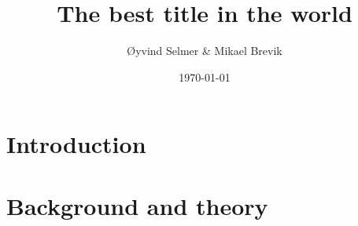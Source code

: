 \documentclass[a4paper, 11pt]{report}
\title{The best title in the world}
\author{Øyvind Selmer \& Mikael Brevik}
\date{\today}
\begin{document}
\maketitle

\tableofcontents

\listoffigures



\chapter{Introduction}


\chapter{Background and theory}





\end{document}
